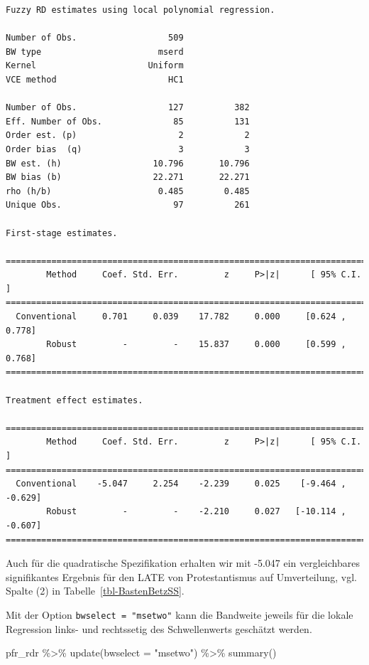 \documentclass[
  a4paper,
  DIV=11,
  oneside]{scrreprt}
\newenvironment{Shaded}{\begin{snugshade}}{\end{snugshade}}
\newcommand{\AttributeTok}[1]{\textcolor[rgb]{0.40,0.45,0.13}{#1}}
\newcommand{\FunctionTok}[1]{\textcolor[rgb]{0.28,0.35,0.67}{#1}}
\newcommand{\NormalTok}[1]{\textcolor[rgb]{0.00,0.23,0.31}{#1}}
\newcommand{\SpecialCharTok}[1]{\textcolor[rgb]{0.37,0.37,0.37}{#1}}
\newcommand{\StringTok}[1]{\textcolor[rgb]{0.13,0.47,0.30}{#1}}
\begin{document}
\begin{verbatim}
Fuzzy RD estimates using local polynomial regression.

Number of Obs.                  509
BW type                       mserd
Kernel                      Uniform
VCE method                      HC1

Number of Obs.                  127          382
Eff. Number of Obs.              85          131
Order est. (p)                    2            2
Order bias  (q)                   3            3
BW est. (h)                  10.796       10.796
BW bias (b)                  22.271       22.271
rho (h/b)                     0.485        0.485
Unique Obs.                      97          261

First-stage estimates.

=============================================================================
        Method     Coef. Std. Err.         z     P>|z|      [ 95% C.I. ]       
=============================================================================
  Conventional     0.701     0.039    17.782     0.000     [0.624 , 0.778]     
        Robust         -         -    15.837     0.000     [0.599 , 0.768]     
=============================================================================

Treatment effect estimates.

=============================================================================
        Method     Coef. Std. Err.         z     P>|z|      [ 95% C.I. ]       
=============================================================================
  Conventional    -5.047     2.254    -2.239     0.025    [-9.464 , -0.629]    
        Robust         -         -    -2.210     0.027   [-10.114 , -0.607]    
=============================================================================
\end{verbatim}

Auch für die quadratische Spezifikation erhalten wir mit -5.047 ein
vergleichbares signifikantes Ergebnis für den LATE von Protestantismus
auf Umverteilung, vgl. Spalte (2) in Tabelle~\ref{tbl-BastenBetzSS}.

Mit der Option \texttt{bwselect\ =\ "msetwo"} kann die Bandweite jeweils
für die lokale Regression links- und rechtssetig des Schwellenwerts
geschätzt werden.

\begin{Shaded}
\begin{Highlighting}[]
\NormalTok{pfr\_rdr }\SpecialCharTok{\%\textgreater{}\%} 
  \FunctionTok{update}\NormalTok{(}\AttributeTok{bwselect =} \StringTok{"msetwo"}\NormalTok{) }\SpecialCharTok{\%\textgreater{}\%}
  \FunctionTok{summary}\NormalTok{()}
\end{Highlighting}
\end{Shaded}
\end{document}
